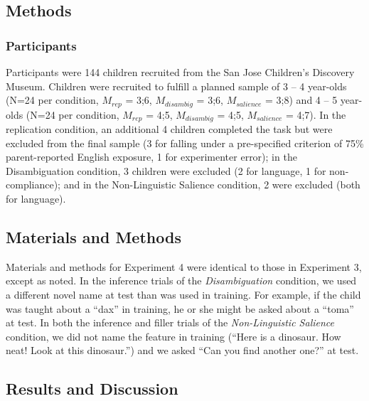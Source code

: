 \documentclass[man,noapacite]{apa2}
\begin{document}
\subsection{Methods}

\subsubsection{Participants}

Participants were 144 children recruited from the San Jose Children's Discovery Museum. Children were recruited to fulfill a planned sample of 3 -- 4 year-olds (N=24 per condition, $M_{rep}$ = 3;6, $M_{disambig}$ = 3;6, $M_{salience}$ = 3;8) and 4 -- 5 year-olds (N=24 per condition, $M_{rep}$ = 4;5, $M_{disambig}$ = 4;5, $M_{salience}$ = 4;7). In the replication condition, an additional 4 children completed the task but were excluded from the final sample (3 for falling under a pre-specified criterion of 75\% parent-reported English  exposure, 1 for experimenter error); in the Disambiguation condition, 3 children were excluded (2 for language, 1 for non-compliance); and in the Non-Linguistic Salience condition, 2 were excluded (both for language).

\subsection{Materials and Methods}

Materials and methods for Experiment 4 were identical to those in Experiment 3, except as noted. In the inference trials of the {\em Disambiguation} condition, we used a different novel name at test than was used in training. For example, if the child was taught about a ``dax'' in training, he or she might be asked about a ``toma'' at test. In both the inference and filler trials of the {\em Non-Linguistic Salience} condition, we did not name the feature in training (``Here is a dinosaur. How neat! Look at this dinosaur.'') and we asked ``Can you find another one?'' at test.

\subsection{Results and Discussion}
\end{document}
